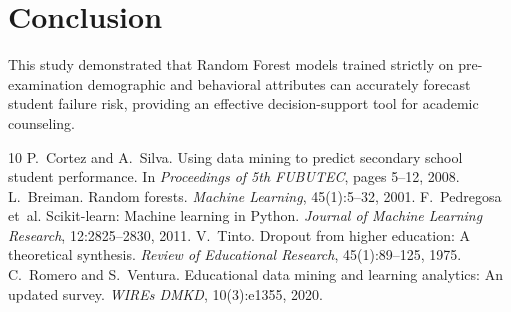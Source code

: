 \documentclass[twoside,11pt]{article}
\begin{document}
\section{Conclusion}
This study demonstrated that Random Forest models trained strictly on pre-examination demographic and behavioral attributes can accurately forecast student failure risk, providing an effective decision-support tool for academic counseling.


\begin{thebibliography}{10}
 P.~Cortez and A.~Silva. Using data mining to predict secondary school student performance. In \emph{Proceedings of 5th FUBUTEC}, pages 5--12, 2008.
 L.~Breiman. Random forests. \emph{Machine Learning}, 45(1):5--32, 2001.
 F.~Pedregosa et~al. Scikit-learn: Machine learning in Python. \emph{Journal of Machine Learning Research}, 12:2825--2830, 2011.
 V.~Tinto. Dropout from higher education: A theoretical synthesis. \emph{Review of Educational Research}, 45(1):89--125, 1975.
 C.~Romero and S.~Ventura. Educational data mining and learning analytics: An updated survey. \emph{WIREs DMKD}, 10(3):e1355, 2020.
\end{thebibliography}
\end{document}
